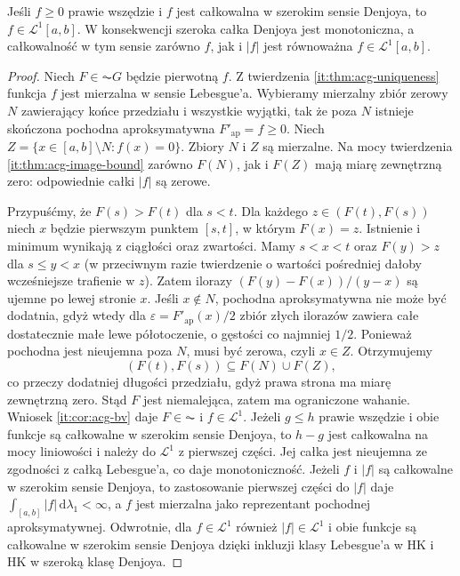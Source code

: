 \begin{twierdzenie}\label{ma1:kh:thm:wide-denjoy-positive}
Jeśli $f\ge0$ prawie wszędzie i $f$ jest całkowalna w szerokim sensie Denjoya, to $f\in\mathcal L^1[a,b]$. W konsekwencji szeroka całka Denjoya jest monotoniczna, a całkowalność w tym sensie zarówno $f$, jak i $|f|$ jest równoważna $f\in\mathcal L^1[a,b]$.
\end{twierdzenie}
\begin{proof}
Niech $F\in\AC G$ będzie pierwotną $f$. Z twierdzenia
\ref{it:thm:acg-uniqueness} funkcja $f$ jest mierzalna
w sensie Lebesgue'a. Wybieramy mierzalny zbiór zerowy $N$
zawierający końce przedziału i wszystkie wyjątki, tak że
poza $N$ istnieje skończona pochodna aproksymatywna
$F'_{\mathrm{ap}}=f\ge0$. Niech
$Z=\{x\in[a,b]\setminus N:f(x)=0\}$.
Zbiory $N$ i $Z$ są mierzalne. Na mocy twierdzenia
\ref{it:thm:acg-image-bound} zarówno $F(N)$, jak i $F(Z)$
mają miarę zewnętrzną zero: odpowiednie całki $|f|$
są zerowe.

Przypuśćmy, że $F(s)>F(t)$ dla $s<t$. Dla każdego $z\in(F(t),F(s))$ niech $x$ będzie pierwszym punktem $[s,t]$, w którym $F(x)=z$. Istnienie i minimum wynikają z ciągłości oraz zwartości. Mamy $s<x<t$ oraz $F(y)>z$ dla $s\le y<x$ (w przeciwnym razie twierdzenie o wartości pośredniej dałoby wcześniejsze trafienie w $z$). Zatem ilorazy $(F(y)-F(x))/(y-x)$ są ujemne po lewej stronie $x$. Jeśli $x\notin N$, pochodna aproksymatywna nie może być dodatnia, gdyż wtedy dla $\varepsilon=F'_{\mathrm{ap}}(x)/2$ zbiór złych ilorazów zawiera całe dostatecznie małe lewe półotoczenie, o gęstości co najmniej $1/2$. Ponieważ pochodna jest nieujemna poza $N$, musi być zerowa, czyli $x\in Z$. Otrzymujemy
\[
 (F(t),F(s))\subseteq F(N)\cup F(Z),
\]
co przeczy dodatniej długości przedziału, gdyż prawa strona ma miarę zewnętrzną zero. Stąd $F$ jest niemalejąca, zatem ma ograniczone wahanie. Wniosek \ref{it:cor:acg-bv} daje $F\in\AC$ i $f\in\mathcal L^1$. Jeżeli $g\le h$ prawie wszędzie i obie funkcje są całkowalne w szerokim sensie Denjoya, to $h-g$ jest całkowalna na mocy liniowości i należy do $\mathcal L^1$ z pierwszej części. Jej całka jest nieujemna ze zgodności z całką Lebesgue'a, co daje monotoniczność. Jeżeli $f$ i $|f|$ są całkowalne w szerokim sensie Denjoya, to zastosowanie pierwszej części do $|f|$ daje $\int_{[a,b]}|f|\,\mathrm d\lambda_1<\infty$, a $f$ jest mierzalna jako reprezentant pochodnej aproksymatywnej. Odwrotnie, dla $f\in\mathcal L^1$ również $|f|\in\mathcal L^1$ i obie funkcje są całkowalne w szerokim sensie Denjoya dzięki inkluzji klasy Lebesgue'a w HK i HK w szeroką klasę Denjoya.
\end{proof}
